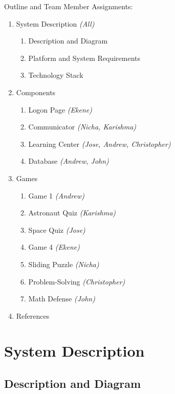 \documentclass[12pt]{article}
\begin{document}
\centering
\thispagestyle{empty}
\Large{Outline and Team Member Assignments:}\\
\vspace{1em}
\begin{enumerate}[label*=\arabic*.]
\normalsize
    \item System Description \emph{(All)}
        \begin{enumerate}[label*=\arabic*.]
            \item Description and Diagram
            \item Platform and System Requirements
            \item Technology Stack
        \end{enumerate}
    \item Components
        \begin{enumerate}[label*=\arabic*.]
            \item Logon Page \emph{(Ekene)}
            \item Communicator \emph{(Nicha, Karishma)}
            \item Learning Center \emph{(Jose, Andrew, Christopher)}
            \item Database \emph{(Andrew, John)}
        \end{enumerate}
    \item Games
        \begin{enumerate}[label*=\arabic*.]
            \item Game 1 \emph{(Andrew)}
            \item Astronaut Quiz \emph{(Karishma)}
            \item Space Quiz \emph{(Jose)}
            \item Game 4 \emph{(Ekene)}
            \item Sliding Puzzle \emph{(Nicha)}
            \item Problem-Solving \emph{(Christopher)}
            \item Math Defense \emph{(John)}
        \end{enumerate}
    \item References
\end{enumerate}

\pagebreak
\normalsize
\setcounter{page}{1}
\justify

\section{System Description}
    \subsection{Description and Diagram}
\end{document}
